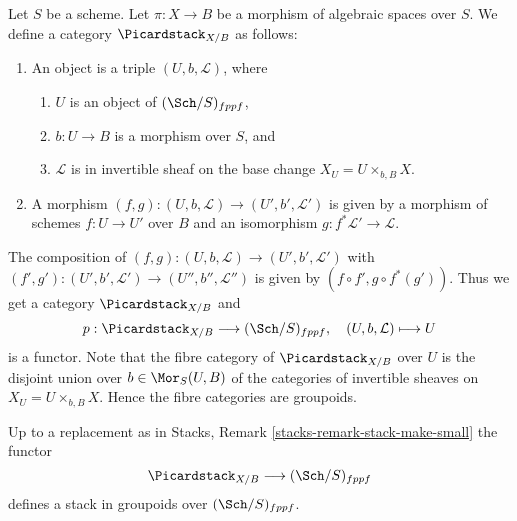 \medskip\noindent
Let $S$ be a scheme.
Let $\pi : X \to B$ be a morphism of algebraic spaces over $S$.
We define a category $\Picardstack_{X/B}$ as follows:
\begin{enumerate}
\item An object is a triple $(U, b, \mathcal{L})$, where
\begin{enumerate}
\item $U$ is an object of $(\Sch/S)_{fppf}$,
\item $b : U \to B$ is a morphism over $S$, and
\item $\mathcal{L}$ is in invertible sheaf on the base change
$X_U = U \times_{b, B} X$.
\end{enumerate}
\item A morphism $(f, g) : (U, b, \mathcal{L}) \to (U', b', \mathcal{L}')$
is given by a morphism of schemes $f : U \to U'$ over $B$ and an
isomorphism $g : f^*\mathcal{L}' \to \mathcal{L}$.
\end{enumerate}
The composition of
$(f, g) : (U, b, \mathcal{L}) \to (U', b', \mathcal{L}')$
with
$(f', g') : (U', b', \mathcal{L}') \to (U'', b'', \mathcal{L}'')$
is given by $(f \circ f', g \circ f^*(g'))$.
Thus we get a category $\Picardstack_{X/B}$ and
$$
p : \Picardstack_{X/B} \longrightarrow (\Sch/S)_{fppf},
\quad
(U, b, \mathcal{L}) \longmapsto U
$$
is a functor. Note that the fibre category of $\Picardstack_{X/B}$ over $U$
is the disjoint union over $b \in \Mor_S(U, B)$ of the categories
of invertible sheaves on $X_U = U \times_{b, B} X$. Hence the fibre
categories are groupoids.

\begin{lemma}
\label{lemma-picard-stack}
Up to a replacement as in
Stacks, Remark \ref{stacks-remark-stack-make-small}
the functor
$$
\Picardstack_{X/B} \longrightarrow (\Sch/S)_{fppf}
$$
defines a stack in groupoids over $(\Sch/S)_{fppf}$.
\end{lemma}

